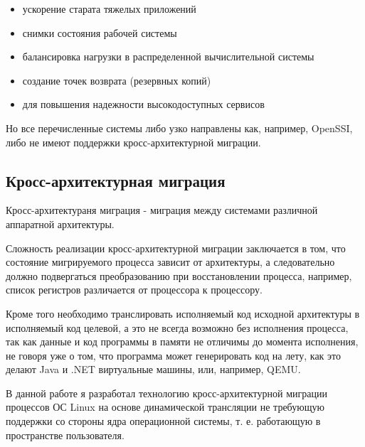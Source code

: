 \begin{itemize}

    \item ускорение старата тяжелых приложений
    \item снимки состояния рабочей системы
    \item балансировка нагрузки в распределенной вычислительной системы
    \item создание точек возврата (резервных копий)
    \item для повышения надежности высокодоступных сервисов

\end{itemize}

Но все перечисленные системы либо узко направлены как, например, OpenSSI, либо не имеют поддержки кросс-архитектурной миграции.

\subsection{Кросс-архитектурная миграция}

\begin{Def}\label{cross_migration}
Кросс-архитектураня миграция - миграция между системами различной аппаратной архитектуры.
\end{Def}

Сложность реализации кросс-архитектурной миграции заключается в том, что состояние мигрируемого процесса зависит от архитектуры, а следовательно должно подвергаться преобразованию при восстановлении процесса, например, список регистров различается от процессора к процессору.

Кроме того необходимо транслировать исполняемый код исходной архитектуры в исполняемый код целевой, а это не всегда возможно без исполнения процесса, так как данные и код программы в памяти не отличимы до момента исполнения, не говоря уже о том, что программа может генерировать код на лету, как это делают Java и .NET виртуальные машины, или, например, QEMU.

В данной работе я разработал технологию кросс-архитектурной миграции процессов ОС Linux на основе динамической трансляции не требующую поддержки со стороны ядра операционной системы, т. е. работающую в пространстве пользователя.
